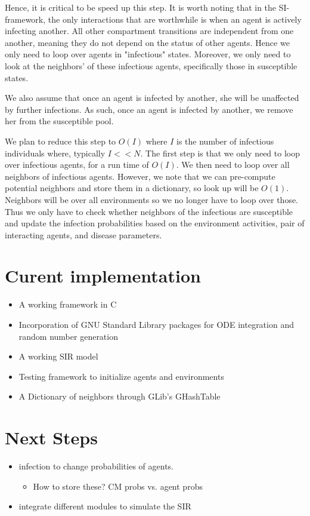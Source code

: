 \documentclass{article}
\begin{document}
Hence, it is critical to be speed up this step.  It is worth noting that in the SI-framework, the only interactions that are worthwhile is when an agent is actively infecting another.  All other compartment transitions are independent from one another, meaning they do not depend on the status of other agents.  Hence we only need to loop over agents in "infectious" states.  Moreover, we only need to look at the neighbors' of these infectious agents, specifically those in susceptible states.

We also assume that once an agent is infected by another, she will be unaffected by further infections.  As such, once an agent is infected by another, we remove her from the susceptible pool.

We plan to reduce this step to $O(I)$ where $I$ is the number of infectious individuals where, typically $I << N$.  The first step is that we only need to loop over infectious agents, for a run time of $O(I)$.  We then need to loop over all neighbors of infectious agents.  However, we note that we can pre-compute potential neighbors and store them in a dictionary, so look up will be $O(1)$.  Neighbors will be over all environments so we no longer have to loop over those.  Thus we only have to check whether neighbors of the infectious are susceptible and update the infection probabilities based on the environment activities, pair of interacting agents, and disease parameters.



\section{Curent implementation}
\label{sec-3}
\begin{itemize}
\item A working framework in C
\item Incorporation of GNU Standard Library packages for ODE integration and random number generation
\item A working SIR model
\item Testing framework to initialize agents and environments
\item A Dictionary of neighbors through GLib's GHashTable
\end{itemize}

\section{Next Steps}
\label{sec-4}
\begin{itemize}
\item infection to change probabilities of agents.
\begin{itemize}
\item How to store these? CM probs vs. agent probs
\end{itemize}
\item integrate different modules to simulate the SIR
\end{itemize}
\end{document}
